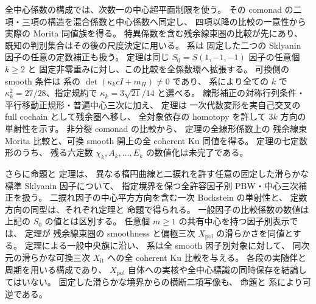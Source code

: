 全中心係数の構成では、次数一の中心超平面制限を使う。
その comonad の二項・三項の構造を混合係数と中心係数へ同定し、
四項以降の比較の一意性から実際の Morita 同値族を得る。
特異係数を含む残余線束圏の比較が先にあり、
既知の判別集合はその後の尺度決定に用いる。
系は
固定した二つの Sklyanin 因子の任意の定数補正も扱う。
定理は同じ $S_0=S(1,-1,-1)$ 因子の任意個 $k\ge2$ と
固定非零重みに対し、この比較を全係数環へ拡張する。
可換側の smooth 条件は
系の
$\det(\kappa_kcI+m_H)\ne0$ であり、
系により全ての $k$ で
$\kappa_k^2=27/28$、指定規約で $\kappa_k=3\sqrt{21}/14$ と選べる。
線形補正の対称行列条件・平行移動正規形・普遍中心三次に加え、
定理は
一次代数変形を実自己交叉の full cochain として残余圏へ移し、
全対象依存の homotopy を許して $3k$ 方向の単射性を示す。
非分裂 comonad の比較から、
定理の全線形係数上の
残余線束 Morita 比較と、可換 smooth 開上の全 coherent Ku 同値を得る。
定理の七定数形のうち、
残る六定数 $\chi_k,A_k,\ldots,E_k$ の数値化は未完了である。

さらに命題と
定理は、
異なる楕円曲線と二捩れを許す任意の固定した滑らかな標準 Sklyanin 因子について、
指定境界を保つ全許容因子別 PBW・中心三次補正を扱う。
二捩れ因子の中心平方方向を含む一次 Bockstein の単射性と、
定数方向の同型は、それぞれ定理と
命題で得られる。
一般因子の比較係数の数値は上記の $S_0$ の値とは区別する。
任意個 $m\ge1$ の共有中心を持つ因子別表示では、
定理が
残余線束圏の smoothness と偏極三次 $X_{\mathrm{pol}}$ の滑らかさを同値とする。
定理による一般中央旗に沿い、
系は全 smooth 因子別対象に対して、
同次元の滑らかな可換三次 $X_{\mathrm{it}}$ への全 coherent Ku 比較を与える。
各段の実随伴と周期を用いる構成であり、
$X_{\mathrm{pol}}$ 自体への実核や全中心標識の同時保存を結論してはいない。
固定した滑らかな境界からの横断二項写像も、
命題と
系により可逆である。

